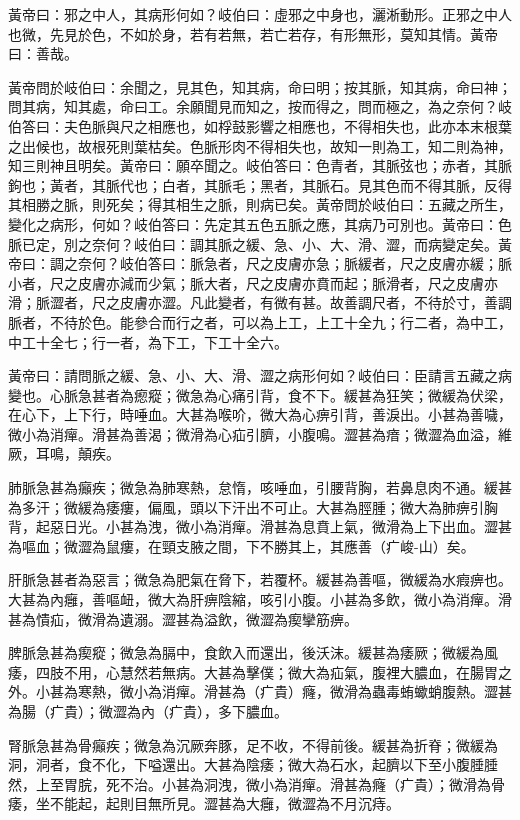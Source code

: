 黃帝曰：邪之中人，其病形何如？岐伯曰：虛邪之中身也，灑淅動形。正邪之中人也微，先見於色，不如於身，若有若無，若亡若存，有形無形，莫知其情。黃帝曰：善哉。

黃帝問於岐伯曰：余聞之，見其色，知其病，命曰明；按其脈，知其病，命曰神；問其病，知其處，命曰工。余願聞見而知之，按而得之，問而極之，為之奈何？岐伯答曰：夫色脈與尺之相應也，如桴鼓影響之相應也，不得相失也，此亦本末根葉之出候也，故根死則葉枯矣。色脈形肉不得相失也，故知一則為工，知二則為神，知三則神且明矣。黃帝曰：願卒聞之。岐伯答曰：色青者，其脈弦也；赤者，其脈鉤也；黃者，其脈代也；白者，其脈毛；黑者，其脈石。見其色而不得其脈，反得其相勝之脈，則死矣；得其相生之脈，則病已矣。黃帝問於岐伯曰：五藏之所生，變化之病形，何如？岐伯答曰：先定其五色五脈之應，其病乃可別也。黃帝曰：色脈已定，別之奈何？岐伯曰：調其脈之緩、急、小、大、滑、澀，而病變定矣。黃帝曰：調之奈何？岐伯答曰：脈急者，尺之皮膚亦急；脈緩者，尺之皮膚亦緩；脈小者，尺之皮膚亦減而少氣；脈大者，尺之皮膚亦賁而起；脈滑者，尺之皮膚亦滑；脈澀者，尺之皮膚亦澀。凡此變者，有微有甚。故善調尺者，不待於寸，善調脈者，不待於色。能參合而行之者，可以為上工，上工十全九；行二者，為中工，中工十全七；行一者，為下工，下工十全六。

黃帝曰：請問脈之緩、急、小、大、滑、澀之病形何如？岐伯曰：臣請言五藏之病變也。心脈急甚者為瘛瘲；微急為心痛引背，食不下。緩甚為狂笑；微緩為伏梁，在心下，上下行，時唾血。大甚為喉吤，微大為心痹引背，善淚出。小甚為善噦，微小為消癉。滑甚為善渴；微滑為心疝引臍，小腹鳴。澀甚為瘖；微澀為血溢，維厥，耳鳴，顛疾。

肺脈急甚為癲疾；微急為肺寒熱，怠惰，咳唾血，引腰背胸，若鼻息肉不通。緩甚為多汗；微緩為痿瘻，偏風，頭以下汗出不可止。大甚為脛腫；微大為肺痹引胸背，起惡日光。小甚為洩，微小為消癉。滑甚為息賁上氣，微滑為上下出血。澀甚為嘔血；微澀為鼠瘻，在頸支腋之間，下不勝其上，其應善（疒峻-山）矣。

肝脈急甚者為惡言；微急為肥氣在脅下，若覆杯。緩甚為善嘔，微緩為水瘕痹也。大甚為內癰，善嘔衄，微大為肝痹陰縮，咳引小腹。小甚為多飲，微小為消癉。滑甚為憒疝，微滑為遺溺。澀甚為溢飲，微澀為瘈攣筋痹。

脾脈急甚為瘈瘲；微急為膈中，食飲入而還出，後沃沫。緩甚為痿厥；微緩為風痿，四肢不用，心慧然若無病。大甚為擊僕；微大為疝氣，腹裡大膿血，在腸胃之外。小甚為寒熱，微小為消癉。滑甚為（疒貴）癃，微滑為蟲毒蛕蠍蛸腹熱。澀甚為腸（疒貴）；微澀為內（疒貴），多下膿血。

腎脈急甚為骨癲疾；微急為沉厥奔豚，足不收，不得前後。緩甚為折脊；微緩為洞，洞者，食不化，下嗌還出。大甚為陰痿；微大為石水，起臍以下至小腹腄腄然，上至胃脘，死不治。小甚為洞洩，微小為消癉。滑甚為癃（疒貴）；微滑為骨痿，坐不能起，起則目無所見。澀甚為大癰，微澀為不月沉痔。

